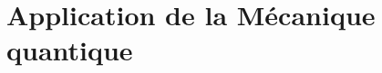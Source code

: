 \documentclass{book}
\numberwithin{equation}{part}
\begin{document}
\part{Application de la Mécanique quantique}

\newpage
\newpage

\newpage
\end{document}
